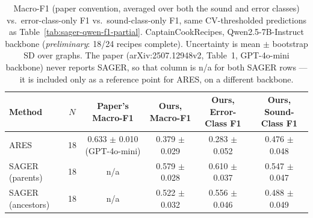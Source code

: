 \begin{table}[h]
\centering
\caption{Macro-F1 (paper convention, averaged over both the sound and error
  classes) vs.\ error-class-only F1 vs.\ sound-class-only F1, same
  CV-thresholded predictions as Table~\ref{tab:sager-qwen-f1-partial}.
  CaptainCookRecipes, Qwen2.5-7B-Instruct backbone (\emph{preliminary}: 18/24
  recipes complete). Uncertainty is mean $\pm$ bootstrap SD over graphs.
  The paper (arXiv:2507.12948v2, Table~1, GPT-4o-mini backbone) never
  reports SAGER, so that column is n/a for both SAGER rows --- it is included
  only as a reference point for ARES, on a different backbone.}\label{tab:sager-qwen-macrof1-partial}
\begin{tabular}{lccccc}
\toprule
Method & $N$ & Paper's Macro-F1 & Ours, Macro-F1 & Ours, Error-Class F1 & Ours, Sound-Class F1 \\
\midrule
ARES               & 18 & 0.633 $\pm$ 0.010 (GPT-4o-mini) & 0.379 $\pm$ 0.029 & 0.283 $\pm$ 0.052 & 0.476 $\pm$ 0.048 \\
SAGER (parents)     & 18 & n/a                             & 0.579 $\pm$ 0.028 & 0.610 $\pm$ 0.037 & 0.547 $\pm$ 0.047 \\
SAGER (ancestors)   & 18 & n/a                             & 0.522 $\pm$ 0.032 & 0.556 $\pm$ 0.046 & 0.488 $\pm$ 0.049 \\
\bottomrule
\end{tabular}
\end{table}

%


